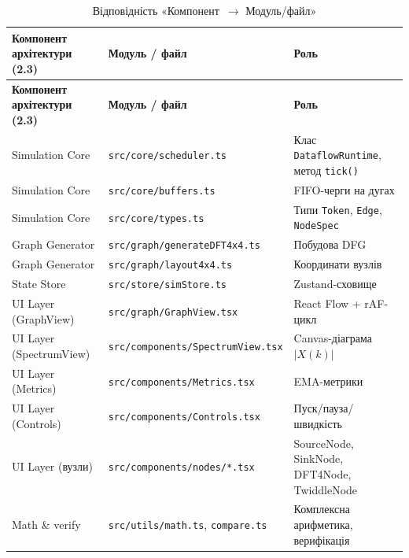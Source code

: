 \begin{longtable}[]{@{}
  >{\raggedright\arraybackslash}p{}
  >{\raggedright\arraybackslash}p{}
  >{\raggedright\arraybackslash}p{}@{}}
\caption[Відповідність компонентів архітектури та модулів коду]{Відповідність
«Компонент~$\rightarrow$ Модуль/файл»}\tabularnewline
\toprule\noalign{}
\begin{minipage}[b]{\linewidth}\raggedright
\textbf{Компонент архітектури (2.3)}
\end{minipage} & \begin{minipage}[b]{\linewidth}\raggedright
\textbf{Модуль / файл}
\end{minipage} & \begin{minipage}[b]{\linewidth}\raggedright
\textbf{Роль}
\end{minipage} \\
\midrule\noalign{}
\endfirsthead
\toprule\noalign{}
\begin{minipage}[b]{\linewidth}\raggedright
\textbf{Компонент архітектури (2.3)}
\end{minipage} & \begin{minipage}[b]{\linewidth}\raggedright
\textbf{Модуль / файл}
\end{minipage} & \begin{minipage}[b]{\linewidth}\raggedright
\textbf{Роль}
\end{minipage} \\
\midrule\noalign{}
\endhead
\bottomrule\noalign{}
\endlastfoot
Simulation Core & \texttt{src/core/scheduler.ts} & Клас
\texttt{DataflowRuntime}, метод \texttt{tick()} \\
Simulation Core & \texttt{src/core/buffers.ts} & FIFO-черги на дугах \\
Simulation Core & \texttt{src/core/types.ts} & Типи \texttt{Token},
\texttt{Edge}, \texttt{NodeSpec} \\
Graph Generator & \texttt{src/graph/generateDFT4x4.ts} & Побудова DFG \\
Graph Generator & \texttt{src/graph/layout4x4.ts} & Координати вузлів \\
State Store & \texttt{src/store/simStore.ts} & Zustand-сховище \\
UI Layer (GraphView) & \texttt{src/graph/GraphView.tsx} & React Flow +
rAF-цикл \\
UI Layer (SpectrumView) & \texttt{src/components/SpectrumView.tsx} &
Canvas-діаграма \(|X(k)|\) \\
UI Layer (Metrics) & \texttt{src/components/Metrics.tsx} &
EMA-метрики \\
UI Layer (Controls) & \texttt{src/components/Controls.tsx} &
Пуск/пауза/швидкість \\
UI Layer (вузли) & \texttt{src/components/nodes/*.tsx} & SourceNode,
SinkNode, DFT4Node, TwiddleNode \\
Math \& verify & \texttt{src/utils/math.ts}, \texttt{compare.ts} &
Комплексна арифметика, верифікація \\
\end{longtable}

